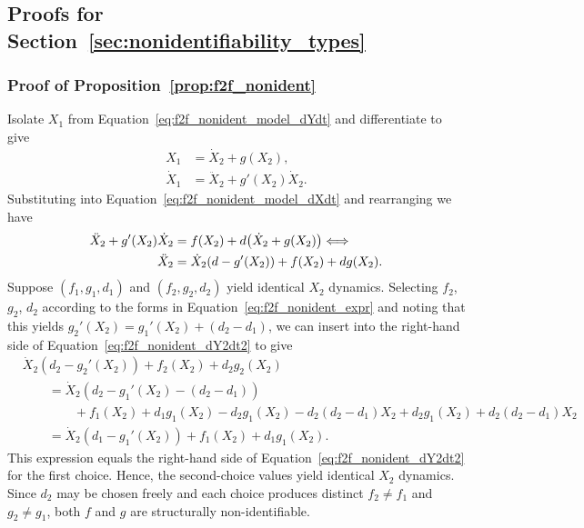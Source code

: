 \documentclass{article}
\theoremstyle{plain}
\theoremstyle{definition}
\begin{document}
{%

\subsection{Proofs for Section~\ref{sec:nonidentifiability_types}} \label{appendix:proofs_section4}

\subsubsection{Proof of Proposition~\ref{prop:f2f_nonident}} \label{appendix:proof_f2f}

Isolate $X_1$ from Equation~\eqref{eq:f2f_nonident_model_dYdt} and differentiate to give
\begin{align*}
    X_1       &= \dot{X}_2 + g(X_2), \\
    \dot{X}_1 &= \ddot{X}_2 + g'(X_2)\dot{X}_2.
\end{align*}
Substituting into Equation~\eqref{eq:f2f_nonident_model_dXdt} and rearranging we have
\begin{align}
    \label{eq:f2f_nonident_dY2dt2}
    \ddot{X}_2 + g'(X_2)\dot{X}_2 &= f(X_2) + d\bigl(\dot{X}_2 + g(X_2)\bigr) \notag \Longleftrightarrow \\
    \ddot{X}_2 &= \dot{X}_2(d - g'(X_2)) + f(X_2) + dg(X_2).
\end{align}
Suppose $(f_1, g_1, d_1)$ and $(f_2, g_2, d_2)$ yield identical $X_2$ dynamics. Selecting $f_2$, $g_2$, $d_2$ according to the forms in Equation~\eqref{eq:f2f_nonident_expr} and noting that this yields $g_2'(X_2) = g_1'(X_2) + (d_2 - d_1)$, we can insert into the right-hand side of Equation~\eqref{eq:f2f_nonident_dY2dt2} to give
\begin{align*}
    &\dot{X}_2(d_2 - g_2'(X_2)) + f_2(X_2) + d_2 g_2(X_2) \\
    & \qquad = \dot{X}_2(d_2 - g_1'(X_2) - (d_2 - d_1)) \\
    &\qquad \qquad  + f_1(X_2) + d_1 g_1(X_2) - d_2 g_1(X_2) - d_2(d_2-d_1)X_2 + d_2 g_1(X_2) + d_2(d_2-d_1)X_2 \\
    &\qquad = \dot{X}_2(d_1 - g_1'(X_2)) + f_1(X_2) + d_1 g_1(X_2).
\end{align*}
This expression equals the right-hand side of Equation~\eqref{eq:f2f_nonident_dY2dt2} for the first choice. Hence, the second-choice values yield identical $X_2$ dynamics. Since $d_2$ may be chosen freely and each choice produces distinct $f_2 \neq f_1$ and $g_2 \neq g_1$, both $f$ and $g$ are structurally non-identifiable.

}
\end{document}
